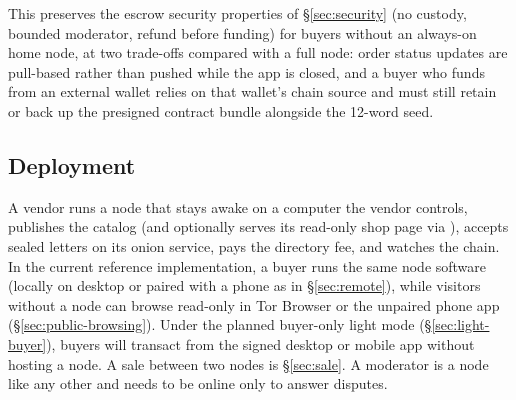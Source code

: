 This preserves the escrow security properties of \S\ref{sec:security} (no custody, bounded moderator, refund before funding) for buyers without an always-on home node, at two trade-offs compared with a full node: order status updates are pull-based rather than pushed while the app is closed, and a buyer who funds from an external wallet relies on that wallet's chain source and must still retain or back up the presigned contract bundle alongside the 12-word seed.

\subsection{Deployment}

A vendor runs a node that stays awake on a computer the vendor controls, publishes the catalog (and optionally serves its read-only shop page via ), accepts sealed letters on its onion service, pays the directory fee, and watches the chain. In the current reference implementation, a buyer runs the same node software (locally on desktop or paired with a phone as in \S\ref{sec:remote}), while visitors without a node can browse read-only in Tor Browser or the unpaired phone app (\S\ref{sec:public-browsing}). Under the planned buyer-only light mode (\S\ref{sec:light-buyer}), buyers will transact from the signed desktop or mobile app without hosting a node. A sale between two nodes is \S\ref{sec:sale}. A moderator is a node like any other and needs to be online only to answer disputes.

